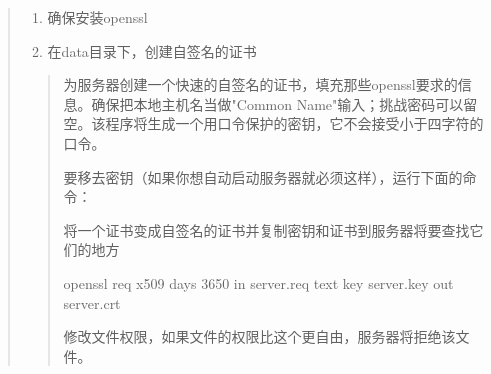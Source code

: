 \documentclass[letterpaper,10pt,english]{sphinxmanual}
\begin{document}
\begin{quote}
\begin{enumerate}
%
\item {} 
确保安装openssl

\item {} 
在data目录下，创建自签名的证书

\end{enumerate}
\begin{quote}

为服务器创建一个快速的自签名的证书，填充那些openssl要求的信息。确保把本地主机名当做"Common Name"输入；挑战密码可以留空。该程序将生成一个用口令保护的密钥，它不会接受小于四字符的口令。

\begin{sphinxVerbatim}[commandchars=\\\{\}]
     
\end{sphinxVerbatim}

要移去密钥（如果你想自动启动服务器就必须这样），运行下面的命令：

\begin{sphinxVerbatim}[commandchars=\\\{\}]
     
 
\end{sphinxVerbatim}

将一个证书变成自签名的证书并复制密钥和证书到服务器将要查找它们的地方

\begin{sphinxVerbatim}[commandchars=\\\{\}]
openssl req \PYGZhy{}x509 \PYGZhy{}days 3650 \PYGZhy{}in server.req \PYGZhy{}text \PYGZhy{}key server.key \PYGZhy{}out server.crt

修改文件权限，如果文件的权限比这个更自由，服务器将拒绝该文件。
\end{sphinxVerbatim}

\begin{sphinxVerbatim}[commandchars=\\\{\}]
  
\end{sphinxVerbatim}


\end{quote}
\end{quote}
\end{document}
